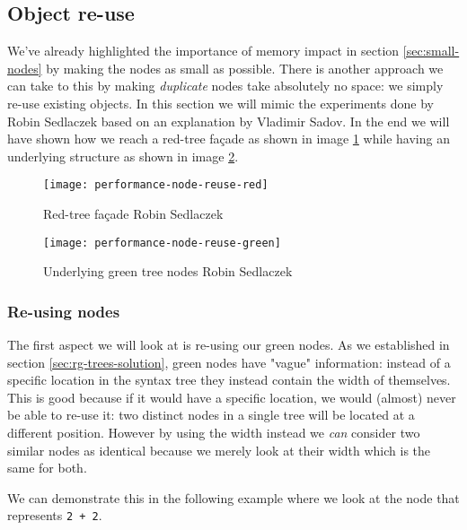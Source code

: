 \subsection{Object re-use}
\label{sec:object-reuse}

We've already highlighted the importance of memory impact in section \ref{sec:small-nodes} by making the nodes as small as possible. There is another approach we can take to this by making \textit{duplicate} nodes take absolutely no space: we simply re-use existing objects. In this section we will mimic the experiments done by Robin Sedlaczek\parencite{Sedlaczek2015} based on an explanation by Vladimir Sadov\parencite{Sadov2014}. In the end we will have shown how we reach a red-tree façade as shown in image \ref{img:performance-node-reuse-red} while having an underlying structure as shown in image \ref{img:performance-node-reuse-green}.

\begin{figure}[h]
\centering
\texttt{[image: performance-node-reuse-red]}
\caption[Red-tree façade]{Red-tree façade \textcopyright Robin Sedlaczek}
\label{img:performance-node-reuse-red}
\end{figure}

\begin{figure}[h]
\centering
\texttt{[image: performance-node-reuse-green]}
\caption[Underlying green tree nodes]{Underlying green tree nodes \textcopyright Robin Sedlaczek}
\label{img:performance-node-reuse-green}
\end{figure}

\subsubsection{Re-using nodes}
\label{sec:re-use-nodes}

The first aspect we will look at is re-using our green nodes. As we established in section \ref{sec:rg-trees-solution}, green nodes have "vague" information: instead of a specific location in the syntax tree they instead contain the width of themselves. This is good because if it would have a specific location, we would (almost) never be able to re-use it: two distinct nodes in a single tree will be located at a different position. However by using the width instead we \textit{can} consider two similar nodes as identical because we merely look at their width which is the same for both.

We can demonstrate this in the following example where we look at the node that represents \verb|2 + 2|.

